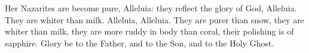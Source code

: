 Her Nazarites are become pure, Alleluia: they reflect the glory of God, Alleluia.
\versseparator
They are whiter than milk. Alleluia, Alleluia.
\versseparator
They are purer than snow, they are whiter than milk, they are more ruddy in body than coral, their polishing is of sapphire.
\versseparator
Glory be to the Father, and to the Son, and to the Holy Ghost.
